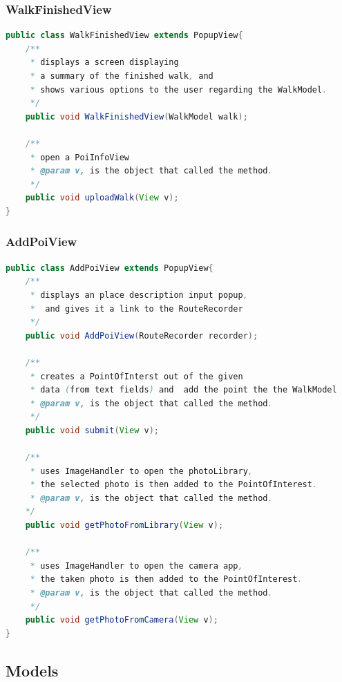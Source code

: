 \documentclass[12pt]{article}
\begin{document}
\subsubsection{WalkFinishedView}
\begin{lstlisting}[language=java]
public class WalkFinishedView extends PopupView{
	/**
	 * displays a screen displaying
	 * a summary of the finished walk, and 
	 * shows various options to the user regarding the WalkModel.
	 */
	public void WalkFinishedView(WalkModel walk);

	/**
	 * open a PoiInfoView
	 * @param v, is the object that called the method.
	 */
	public void uploadWalk(View v);
}
\end{lstlisting}
\subsubsection{AddPoiView}
\begin{lstlisting}[language=java]
public class AddPoiView extends PopupView{
	/**
	 * displays an place description input popup,
	 *  and gives it a link to the RouteRecorder
	 */
	public void AddPoiView(RouteRecorder recorder);

	/**
	 * creates a PointOfInterst out of the given
	 * data (from text fields) and 	add the point the the WalkModel
	 * @param v, is the object that called the method.	
	 */
	public void submit(View v);
	
	/**
	 * uses ImageHandler to open the photoLibrary,
	 * the selected photo is then added to the PointOfInterest.
	 * @param v, is the object that called the method.
	*/
	public void getPhotoFromLibrary(View v);

	/**
	 * uses ImageHandler to open the camera app,
	 * the taken photo is then added to the PointOfInterest.
	 * @param v, is the object that called the method.
	 */
	public void getPhotoFromCamera(View v);
}
\end{lstlisting}
\subsection{Models}
\end{document}
